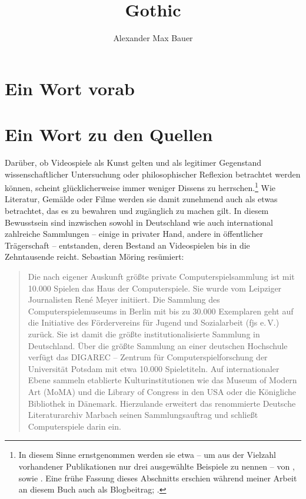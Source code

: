 \documentclass[a5paper,pagesize,numbers=noenddot]{scrbook}
\title{Gothic}
\subtitle{}
\author{Alexander Max Bauer}
\date{}
\begin{document}
\maketitle


\frontmatter
\tableofcontents


\mainmatter
\chapter{Ein Wort vorab}\label{ch:vorwort}


\chapter{Ein Wort zu den Quellen}\label{ch:quellen}
Darüber, ob Videospiele als Kunst gelten und als legitimer Gegenstand wissenschaftlicher Untersuchung oder philosophischer Reflexion betrachtet werden können, scheint glücklicherweise immer weniger Dissens zu herrschen.\footnote{In diesem Sinne ernstgenommen werden sie etwa -- um aus der Vielzahl vorhandener Publikationen nur drei ausgewählte Beispiele zu nennen -- von \autocite{feige_computerspiele_2015}, \autocite{zimmermann_gameskultur_2020} sowie \autocite{beil_game_2018}. Eine frühe Fassung dieses Abschnitts erschien während meiner Arbeit an diesem Buch auch als Blogbeitrag; \autocite[vgl.][]{bauer_sammeln_2025}.}
Wie Literatur, Gemälde oder Filme werden sie damit zunehmend auch als etwas betrachtet, das es zu bewahren und zugänglich zu machen gilt.
In diesem Bewusstsein sind inzwischen sowohl in Deutschland wie auch international zahlreiche Sammlungen -- einige in privater Hand, andere in öffentlicher Trägerschaft -- entstanden, deren Bestand an Videospielen bis in die Zehntausende reicht.
Sebastian Möring resümiert:

\begin{quote}
   Die nach eigener Auskunft größte private Computerspielsammlung ist mit 10.000 Spielen das Haus der Computerspiele.
   Sie wurde vom Leipziger Journalisten René Meyer initiiert.
   Die Sammlung des Computerspielemuseums in Berlin mit bis zu 30.000 Exemplaren geht auf die Initiative des Fördervereins für Jugend und Sozialarbeit (fjs e.\,V.) zurück.
   Sie ist damit die größte institutionalisierte Sammlung in Deutschland.
   Über die größte Sammlung an einer deutschen Hochschule verfügt das DIGAREC -- Zentrum für Computerspielforschung der Universität Potsdam mit etwa 10.000 Spieletiteln.
   Auf internationaler Ebene sammeln etablierte Kulturinstitutionen wie das Museum of Modern Art (MoMA) und die Library of Congress in den USA oder die Königliche Bibliothek in Dänemark.
   Hierzulande erweitert das renommierte Deutsche Literaturarchiv Marbach seinen Sammlungsauftrag und schließt Computerspiele darin ein.\autocite[S.~120]{moering_kulturarchive_2020}
\end{quote}
\end{document}
